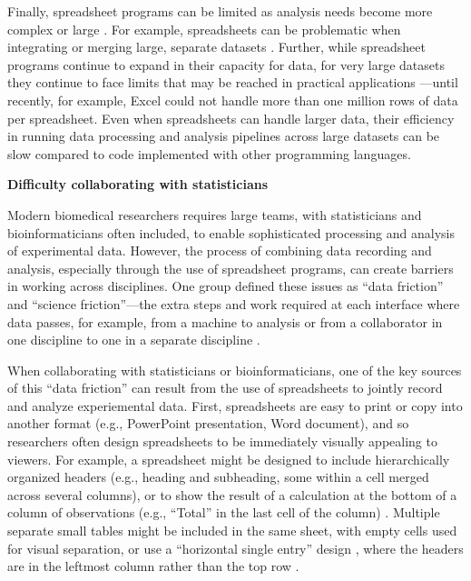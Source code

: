 \documentclass[]{tufte-book}
\begin{document}
Finally, spreadsheet programs can be limited as analysis needs become more
complex or large \citep{topaloglou2004biological}. For example, spreadsheets can be
problematic when integrating or merging large, separate datasets
\citep{birch2018future}. Further, while spreadsheet programs continue to expand in
their capacity for data, for very large datasets they continue to face limits
that may be reached in practical applications \citep{birch2018future}---until
recently, for example, Excel could not handle more than one million rows of data
per spreadsheet. Even when spreadsheets can handle larger data, their efficiency
in running data processing and analysis pipelines across large datasets can be
slow compared to code implemented with other programming languages.

\textbf{Difficulty collaborating with statisticians}

Modern biomedical researchers requires large teams, with statisticians and
bioinformaticians often included, to enable sophisticated processing and
analysis of experimental data. However, the process of combining data recording
and analysis, especially through the use of spreadsheet programs, can create
barriers in working across disciplines. One group defined these issues as ``data
friction'' and ``science friction''---the extra steps and work required at each
interface where data passes, for example, from a machine to analysis or from a
collaborator in one discipline to one in a separate discipline
\citep{edwards2011science}.

When collaborating with statisticians or bioinformaticians, one of the key
sources of this ``data friction'' can result from the use of spreadsheets to
jointly record and analyze experiemental data. First, spreadsheets are easy to
print or copy into another format (e.g., PowerPoint presentation, Word
document), and so researchers often design spreadsheets to be immediately
visually appealing to viewers. For example, a spreadsheet might be designed to
include hierarchically organized headers (e.g., heading and subheading, some
within a cell merged across several columns), or to show the result of a
calculation at the bottom of a column of observations (e.g., ``Total'' in the last
cell of the column) \citep{teixeira2016emergence}. Multiple separate small tables
might be included in the same sheet, with empty cells used for visual
separation, or use a ``horizontal single entry'' design , where the headers are in
the leftmost column rather than the top row \citep{teixeira2016emergence}.
\end{document}
